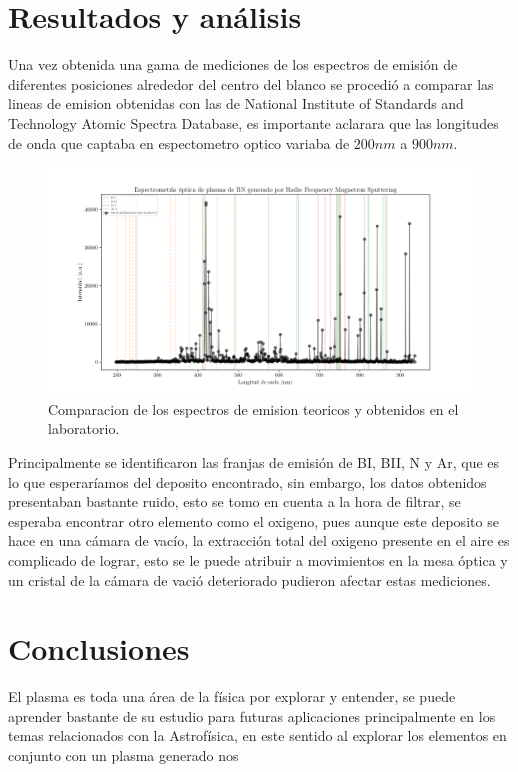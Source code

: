 \documentclass[12pt]{IEEEtran}
\begin{document}
\section{Resultados y análisis}

Una vez obtenida una gama de mediciones de los espectros de emisión  de diferentes posiciones alrededor del centro del blanco se procedió a comparar las lineas de emision obtenidas con las de National Institute of Standards and Technology Atomic Spectra Database, es importante aclarara que las longitudes de onda que captaba en espectometro optico variaba de $200 nm $ a $900 nm$.

\begin{figure}[htp]
	\centering
	\includegraphics[width=0.9\linewidth]{figs/longitudes de onda.png}
	\caption{Comparacion de los espectros de emision teoricos y obtenidos en el laboratorio.}
	\label{Graf:plasma}
\end{figure}

Principalmente se identificaron las franjas de emisión de BI, BII, N y Ar, que es lo que esperaríamos del deposito encontrado, sin embargo, los datos obtenidos presentaban bastante ruido, esto se tomo en cuenta a la hora de filtrar, se esperaba encontrar otro elemento como el oxigeno, pues aunque este deposito se hace en una cámara de vacío, la extracción total del oxigeno presente en el aire es complicado de lograr, esto se le puede atribuir a movimientos en la mesa óptica y un cristal de la cámara de vació deteriorado pudieron afectar estas mediciones.


\section{Conclusiones}
El plasma es toda una área de la física por explorar y entender, se puede aprender bastante de su estudio para futuras aplicaciones principalmente en los temas relacionados con la Astrofísica, en este sentido al explorar los elementos en conjunto con un plasma generado nos

\nocite{*}
\printbibliography
\end{document}
